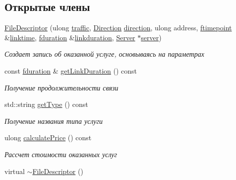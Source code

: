 \subsection*{Открытые члены}
\begin{DoxyCompactItemize}
\item 
\hyperlink{class_network_service_1_1_file_descriptor_a87c067c9340ac785ff7fb7a012ea8bba}{File\+Descriptor} (ulong \hyperlink{class_network_service_1_1_post_descriptor_ae2eef559828a42ec299ab59711f88e59}{traffic}, \hyperlink{namespace_network_service_abe1196dad9e8afcbc5c6b38196ce2c65}{Direction} \hyperlink{class_network_service_1_1_post_descriptor_a04faf66e747b2d4f2d89bf1e92f4ab5c}{direction}, ulong address, \hyperlink{networkservice_8h_ac877dfabb0f4f6a8184aa821b447e81d}{ftimepoint} \&\hyperlink{class_network_service_1_1_service_descriptor_a08bfd17afce0cba1954d30bd76a14df4}{linktime}, \hyperlink{networkservice_8h_a476cc728ef971cba9111c75ea41a760a}{fduration} \&\hyperlink{class_network_service_1_1_file_descriptor_a1ce56aef66c93f0a6a5eebc8d43c4bb8}{linkduration}, \hyperlink{class_network_service_1_1_server}{Server} $\ast$\hyperlink{class_network_service_1_1_service_descriptor_ad504b32ced44a75e0e02ea961d9434c4}{server})
\begin{DoxyCompactList}\small\item\em Создает запись об оказанной услуге, основываясь на параметрах \end{DoxyCompactList}\item 
const \hyperlink{networkservice_8h_a476cc728ef971cba9111c75ea41a760a}{fduration} \& \hyperlink{class_network_service_1_1_file_descriptor_ae77011c643f4d7889a417e6fc91a3c72}{get\+Link\+Duration} () const 
\begin{DoxyCompactList}\small\item\em Получение продолжительности связи \end{DoxyCompactList}\item 
std\+::string \hyperlink{class_network_service_1_1_file_descriptor_a68270f753630bf3ac34c621a56e4f6f7}{get\+Type} () const 
\begin{DoxyCompactList}\small\item\em Получение названия типа услуги \end{DoxyCompactList}\item 
ulong \hyperlink{class_network_service_1_1_file_descriptor_a2c480da1613f7072d3113082d1f8cc54}{calculate\+Price} () const 
\begin{DoxyCompactList}\small\item\em Рассчет стоимости оказанных услуг \end{DoxyCompactList}\item 
virtual \hyperlink{class_network_service_1_1_file_descriptor_aaf3da94e82c4a05406c6872a56701195}{$\sim$\+File\+Descriptor} ()
\end{DoxyCompactItemize}
